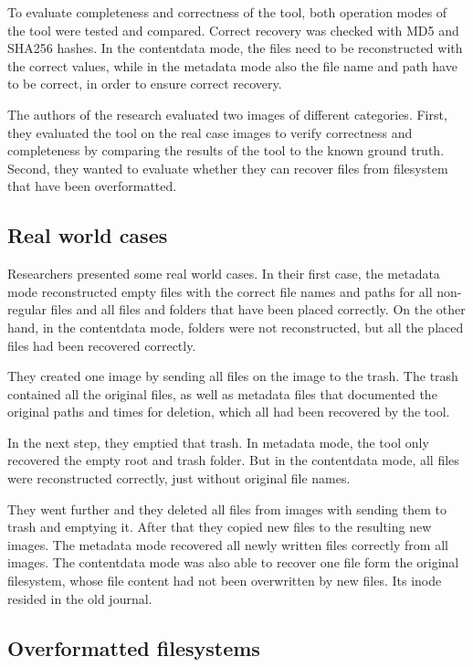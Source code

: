 \documentclass{acm_proc_article-sp}
\begin{document}
To evaluate completeness and correctness of the tool, both operation modes of the tool were tested and compared. Correct recovery was checked with MD5 and SHA256 hashes. In the contentdata mode, the files need to be reconstructed with the correct values, while in the metadata mode also the file name and path have to be correct, in order to ensure correct recovery.

The authors of the research evaluated two images of different categories. First, they evaluated the tool on the real case images to verify correctness and completeness by comparing the results of the tool to the known ground truth. Second, they wanted to evaluate whether they can recover files from filesystem that have been overformatted.

\subsection{Real world cases}

Researchers presented some real world cases. In their first case, the metadata mode reconstructed empty files with the correct file names and paths for all non-regular files and all files and folders that have been
placed correctly. On the other hand, in the contentdata mode, folders were not reconstructed, but all the placed files had been recovered correctly.

They created one image by sending all files on the image to the trash. The trash contained all the original files, as well as metadata files that documented the original paths and times for deletion, which all had been recovered by the tool.

In the next step, they emptied that trash. In metadata mode, the tool only recovered the empty root and trash folder. But in the contentdata mode, all files were reconstructed correctly, just without original file names. 

They went further and they deleted all files from images with sending them to trash and emptying it. After that they copied new files to the resulting new images. The metadata mode recovered all newly written files correctly from all images. The contentdata mode was also able to recover one file form the original filesystem, whose file content had not been overwritten by new files. Its inode resided in the old journal.


\subsection{Overformatted filesystems}
\end{document}
